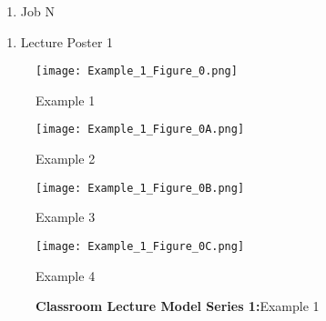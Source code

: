 \documentclass{ResumeDesignFormat1}
\begin{document}
\begin{enumerate}
\item Job N
\end{enumerate}
\begin{enumerate}
\item Lecture Poster 1
\end{enumerate}

\footnotesize
\begin{figure}[h]
	\centering
	\begin{minipage}[b]{0.5\linewidth}
		\texttt{[image: Example\_1\_Figure\_0.png]}
		\caption{\footnotesize Example 1 }
		\label{fig:FigureA}
	\end{minipage}\hfill
	\begin{minipage}[b]{0.5\linewidth}
		\texttt{[image: Example\_1\_Figure\_0A.png]}
		\caption{\footnotesize Example 2}
		\label{fig:FigureB}
	\end{minipage}\hfill
	\begin{minipage}[b]{0.5\linewidth}
		\texttt{[image: Example\_1\_Figure\_0B.png]}
		\caption{\footnotesize Example 3}
		\label{fig:FigureC}
	\end{minipage}\hfill
	\begin{minipage}[b]{0.5\linewidth}
		\texttt{[image: Example\_1\_Figure\_0C.png]}
		\caption{\footnotesize Example 4}
		\label{fig:FigureD}
	\end{minipage}\hfill
	\caption{\textcolor{c5}{\textbf{Classroom Lecture Model Series 1:}}\footnotesize Example 1 }
	\label{fig:Figure1}
\end{figure}
\end{document}
